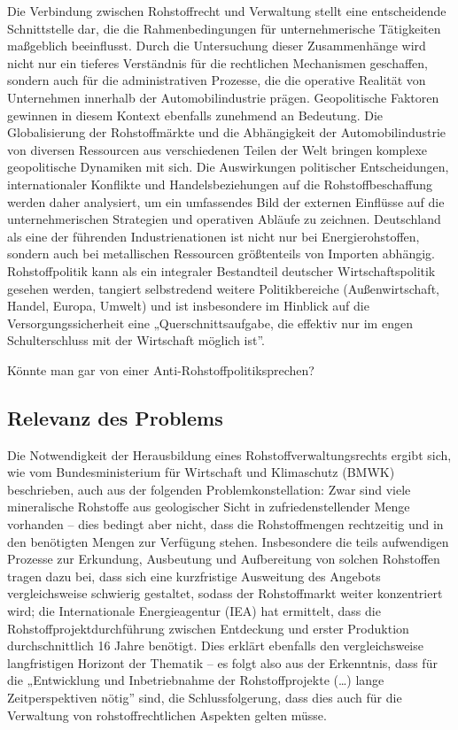 \documentclass[12pt,a4paper,oneside]{book} %
\begin{document}
	Die Verbindung zwischen Rohstoffrecht und Verwaltung stellt eine entscheidende Schnittstelle dar, die die Rahmenbedingungen für unternehmerische Tätigkeiten maßgeblich beeinflusst. Durch die Untersuchung dieser Zusammenhänge wird nicht nur ein tieferes Verständnis für die rechtlichen Mechanismen geschaffen, sondern auch für die administrativen Prozesse, die die operative Realität von Unternehmen innerhalb der Automobilindustrie prägen. Geopolitische Faktoren gewinnen in diesem Kontext ebenfalls zunehmend an Bedeutung. Die Globalisierung der Rohstoffmärkte und die Abhängigkeit der Automobilindustrie von diversen Ressourcen aus verschiedenen Teilen der Welt bringen komplexe geopolitische Dynamiken mit sich. Die Auswirkungen politischer Entscheidungen, internationaler Konflikte und Handelsbeziehungen auf die Rohstoffbeschaffung werden daher analysiert, um ein umfassendes Bild der externen Einflüsse auf die unternehmerischen Strategien und operativen Abläufe zu zeichnen. Deutschland als eine der führenden Industrienationen ist nicht nur bei Energierohstoffen, sondern auch bei metallischen Ressourcen größtenteils von Importen abhängig. \autocite{dauke_rohstoff-_2011} Rohstoffpolitik kann als ein integraler Bestandteil deutscher Wirtschaftspolitik gesehen werden, tangiert selbstredend weitere Politikbereiche (Außenwirtschaft, Handel, Europa, Umwelt) und ist insbesondere im Hinblick auf die Versorgungssicherheit eine „Querschnittsaufgabe, die effektiv nur im engen Schulterschluss mit der Wirtschaft möglich ist”.\autocite{dauke_rohstoff-_2011}
	
	Könnte man gar von einer \glqq Anti-Rohstoffpolitik\grqq sprechen?
	
	\subsection{Relevanz des Problems}
	Die Notwendigkeit der Herausbildung eines Rohstoffverwaltungsrechts ergibt sich, wie vom Bundesministerium für Wirtschaft und Klimaschutz (BMWK) beschrieben,\autocite{bundesministerium_fur_wirtschaft_und_klimaschutz_bmwk_industriepolitik_2023} auch aus der folgenden Problemkonstellation: Zwar sind viele mineralische Rohstoffe aus geologischer Sicht in zufriedenstellender Menge vorhanden – dies bedingt aber nicht, dass die Rohstoffmengen rechtzeitig und in den benötigten Mengen zur Verfügung stehen. Insbesondere die teils aufwendigen Prozesse zur Erkundung, Ausbeutung und Aufbereitung von solchen Rohstoffen tragen dazu bei, dass sich eine kurzfristige Ausweitung des Angebots vergleichsweise schwierig gestaltet, sodass der Rohstoffmarkt weiter konzentriert wird; die Internationale Energieagentur (IEA) hat ermittelt, dass die Rohstoffprojektdurchführung zwischen Entdeckung und erster Produktion durchschnittlich 16 Jahre benötigt.\autocite[12]{international_energy_agency_role_2021} Dies erklärt ebenfalls den vergleichsweise langfristigen Horizont der Thematik – es folgt also aus der Erkenntnis, dass für die „Entwicklung und Inbetriebnahme der Rohstoffprojekte (…) lange Zeitperspektiven nötig” sind,\autocite[13]{bundesministerium_fur_wirtschaft_und_klimaschutz_bmwk_industriepolitik_2023} die Schlussfolgerung, dass dies auch für die Verwaltung von rohstoffrechtlichen Aspekten gelten müsse.
	
\end{document}
